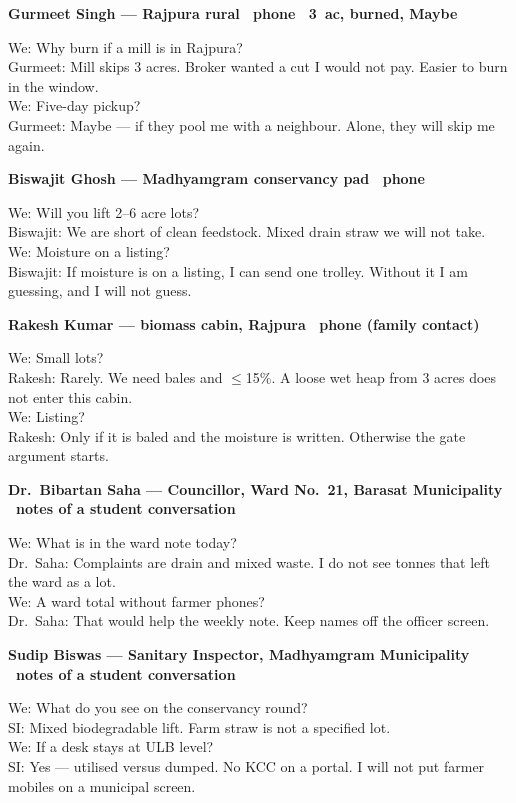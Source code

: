 \documentclass[12pt,a4paper]{article}
\newenvironment{conv}[1]{%
  \par\vspace{0.55em}%
  {\small\bfseries #1}\par\vspace{0.2em}%
  \noindent{\vrule width 2.4pt}\hspace{0.65em}%
  \begin{minipage}[t]{\dimexpr\linewidth-1.0em\relax}\small
}{%
  \end{minipage}\par\vspace{0.25em}%
}
\begin{document}
\begin{conv}{Gurmeet Singh --- Rajpura rural \textbullet\ phone \textbullet\ 3~ac, burned, Maybe}
We: Why burn if a mill is in Rajpura?\\
Gurmeet: Mill skips 3 acres. Broker wanted a cut I would not pay. Easier to burn in the window.\\
We: Five-day pickup?\\
Gurmeet: Maybe --- if they pool me with a neighbour. Alone, they will skip me again.
\end{conv}

\begin{conv}{Biswajit Ghosh --- Madhyamgram conservancy pad \textbullet\ phone}
We: Will you lift 2--6 acre lots?\\
Biswajit: We are short of clean feedstock. Mixed drain straw we will not take.\\
We: Moisture on a listing?\\
Biswajit: If moisture is on a listing, I can send one trolley. Without it I am guessing, and I will not guess.
\end{conv}

\begin{conv}{Rakesh Kumar --- biomass cabin, Rajpura \textbullet\ phone (family contact)}
We: Small lots?\\
Rakesh: Rarely. We need bales and $\le$15\%. A loose wet heap from 3 acres does not enter this cabin.\\
We: Listing?\\
Rakesh: Only if it is baled and the moisture is written. Otherwise the gate argument starts.
\end{conv}

\begin{conv}{Dr.\ Bibartan Saha --- Councillor, Ward No.~21, Barasat Municipality \textbullet\ notes of a student conversation}
We: What is in the ward note today?\\
Dr.\ Saha: Complaints are drain and mixed waste. I do not see tonnes that left the ward as a lot.\\
We: A ward total without farmer phones?\\
Dr.\ Saha: That would help the weekly note. Keep names off the officer screen.
\end{conv}

\begin{conv}{Sudip Biswas --- Sanitary Inspector, Madhyamgram Municipality \textbullet\ notes of a student conversation}
We: What do you see on the conservancy round?\\
SI: Mixed biodegradable lift. Farm straw is not a specified lot.\\
We: If a desk stays at ULB level?\\
SI: Yes --- utilised versus dumped. No KCC on a portal. I will not put farmer mobiles on a municipal screen.
\end{conv}
\end{document}
